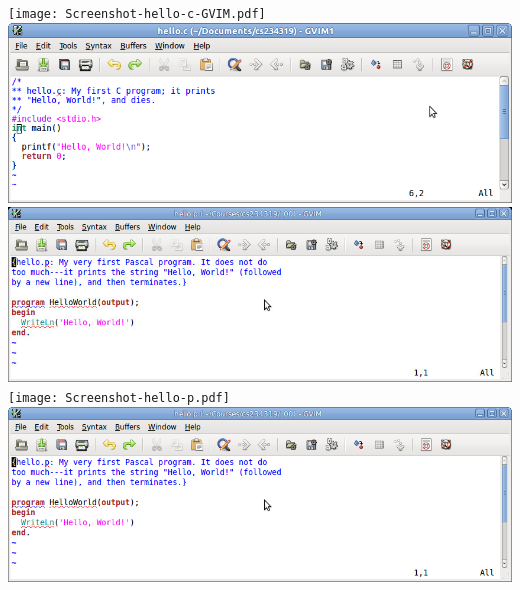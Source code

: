 \documentclass{article}
\begin{document}
\texttt{[image: Screenshot-hello-c-GVIM.pdf]}
\includegraphics{Screenshot-hello-c-GVIM.png}
\includegraphics{Screenshot-hello-p.jpg}
\texttt{[image: Screenshot-hello-p.pdf]}
\includegraphics{Screenshot-hello-p.png}
\end{document}
